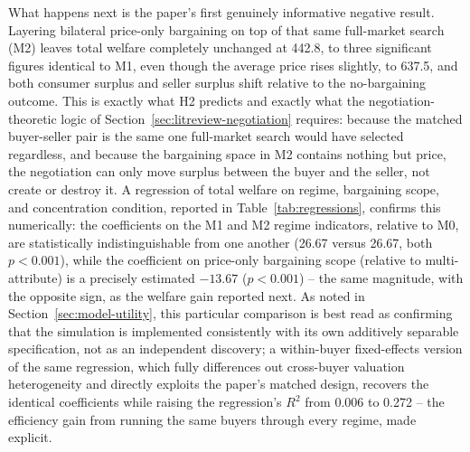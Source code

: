 \documentclass[review]{elsarticle}
\begin{document}
What happens next is the paper's first genuinely informative negative result. Layering bilateral price-only bargaining on top of that same full-market search (M2) leaves total welfare completely unchanged at 442.8, to three significant figures identical to M1, even though the average price rises slightly, to 637.5, and both consumer surplus and seller surplus shift relative to the no-bargaining outcome. This is exactly what H2 predicts and exactly what the negotiation-theoretic logic of Section~\ref{sec:litreview-negotiation} requires: because the matched buyer-seller pair is the same one full-market search would have selected regardless, and because the bargaining space in M2 contains nothing but price, the negotiation can only move surplus between the buyer and the seller, not create or destroy it. A regression of total welfare on regime, bargaining scope, and concentration condition, reported in Table~\ref{tab:regressions}, confirms this numerically: the coefficients on the M1 and M2 regime indicators, relative to M0, are statistically indistinguishable from one another (26.67 versus 26.67, both $p<0.001$), while the coefficient on price-only bargaining scope (relative to multi-attribute) is a precisely estimated $-13.67$ ($p<0.001$) -- the same magnitude, with the opposite sign, as the welfare gain reported next. As noted in Section~\ref{sec:model-utility}, this particular comparison is best read as confirming that the simulation is implemented consistently with its own additively separable specification, not as an independent discovery; a within-buyer fixed-effects version of the same regression, which fully differences out cross-buyer valuation heterogeneity and directly exploits the paper's matched design, recovers the identical coefficients while raising the regression's $R^2$ from 0.006 to 0.272 -- the efficiency gain from running the same buyers through every regime, made explicit.
\end{document}
